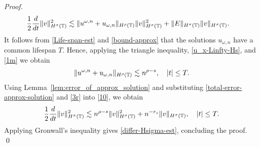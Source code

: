 \begin{proof}
%
%
\begin{equation}
\begin{split}
\frac{1}{2}\frac{d}{dt} \|v\|_{H^\sigma(\mathbb{T})}^2
& \lesssim
\|u^{\omega,n} + u_{\omega,n}\|_{H^{\rho}(\mathbb{T})} \|v\|_{H^\sigma(\mathbb{T})}^2
+ \|E\|_{H^\sigma(\mathbb{T})}
\|v\|_{H^\sigma(\mathbb{T})}.
\label{10}
\end{split}
\end{equation}
%
%
It follows from \eqref{Life-span-est} and 
\eqref{bound-approx} that the solutions $u_{\omega,n}$ have a common 
lifespan $T$. Hence, applying the triangle inequality, 
\eqref{u_x-Linfty-Hs}, and \eqref{1m} we obtain  
%
%
\begin{equation}
\|u^{\omega,n} + u_{\omega,n}\|_{H^\rho(\mathbb{T})} \lesssim n^{\rho -s}, 
\quad |t| \le T.
\label{3r}
\end{equation}
%
%
%
%
%
%
Using Lemma~\ref{lem:error_of_approx_solution} and
substituting \eqref{total-error-approx-solution} and \eqref{3r}
into \eqref{10}, we obtain
%
%
\begin{equation}
\begin{split}
\frac{1}{2}\frac{d}{dt}\|v\|_{H^\sigma(\mathbb{T})}^2 \lesssim n^{\rho - s}
\|v\|_{H^\sigma(\mathbb{T})}^2 + n^{-r_s}\|v\|_{H^\sigma(\mathbb{T})}, \quad |t| \le T.
\label{200r}
\end{split}
\end{equation}
%
%
Applying Gronwall's inequality gives \eqref{differ-Hsigma-est}, concluding 
the proof. \qed 
%
%
%
%
%
%
%


\end{proof}
